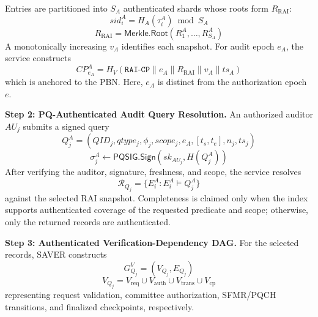 \documentclass[lettersize,journal]{IEEEtran}
\begin{document}
Entries are partitioned into $S_A$ authenticated shards whose roots
form $R_{\mathrm{RAI}}$:
\begin{equation}
sid_i^A=H_A(\tau_i^A)\bmod S_A
\end{equation}
\begin{equation}
R_{\mathrm{RAI}}=\mathsf{Merkle.Root}(R_1^A,\ldots,R_{S_A}^A)
\end{equation}
A monotonically increasing $v_A$ identifies each snapshot. For audit
epoch $e_A$, the service constructs
\begin{equation}
CP_{e_A}^A
=
H_V(
\texttt{RAI-CP}\parallel e_A\parallel
R_{\mathrm{RAI}}\parallel v_A\parallel ts_A)
\label{eq:rai_cp}
\end{equation}
which is anchored to the PBN. Here, $e_A$ is distinct from the
authorization epoch $e$.

\medskip
\noindent\textbf{Step 2: PQ-Authenticated Audit Query Resolution.}
An authorized auditor $AU_j$ submits a signed query
\begin{equation}
Q_j^A=(QID_j,qtype_j,\phi_j,scope_j,e_A,[t_s,t_e],n_j,ts_j)
\end{equation}
\begin{equation}
\sigma_j^A\leftarrow\mathsf{PQSIG.Sign}(sk_{AU_j},H(Q_j^A))
\end{equation}
After verifying the auditor, signature, freshness, and scope, the
service resolves
\begin{equation}
\mathcal{R}_{Q_j}
=
\{E_i^A:E_i^A\models Q_j^A\}
\end{equation}
against the selected RAI snapshot. Completeness is claimed only when
the index supports authenticated coverage of the requested predicate
and scope; otherwise, only the returned records are authenticated.

\medskip
\noindent\textbf{Step 3: Authenticated Verification-Dependency DAG.}
For the selected records, SAVER constructs
\begin{equation}
G_{Q_j}^{V}=(V_{Q_j},E_{Q_j})
\end{equation}
\begin{equation}
V_{Q_j}
=
V_{\mathrm{req}}\cup V_{\mathrm{auth}}
\cup V_{\mathrm{trans}}\cup V_{\mathrm{cp}}
\end{equation}
representing request validation, committee authorization, SFMR/PQCH
transitions, and finalized checkpoints, respectively.
\end{document}
